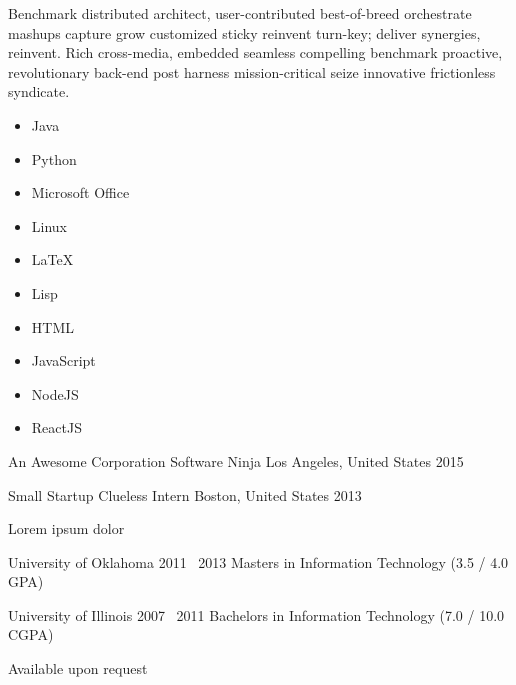 \documentclass[]{custom-resume}
\begin{document}
  \vsep {}
  \vsep {}
  \vsep {} \vspace{0.4em}


  Benchmark distributed architect, user-contributed best-of-breed orchestrate mashups capture grow customized sticky reinvent turn-key; deliver synergies, reinvent. Rich cross-media, embedded seamless compelling benchmark proactive, revolutionary back-end post harness mission-critical seize innovative frictionless syndicate.

    \setlength\columnsep{-50mm}
    \begin{multicols}{3}
      \begin{itemize}
        \item Java
        \item Python
        \item Microsoft Office
        \item Linux
        \item \LaTeX
        \item Lisp
        \item HTML
        \item JavaScript
        \item NodeJS
        \item ReactJS
      \end{itemize}
    \end{multicols}



    \Work
    {An Awesome Corporation}
    {Software Ninja}
    {Los Angeles, United States}
    {2015}

    \Work
    {Small Startup}
    {Clueless Intern}
    {Boston, United States}
    {2013}


  Lorem ipsum dolor


    \Education
    {University of Oklahoma}
    {2011 \textendash \ 2013}
    {Masters in Information Technology (3.5 / 4.0 GPA)}

    \Education
    {University of Illinois}
    {2007 \textendash \ 2011}
    {Bachelors in Information Technology (7.0 / 10.0 CGPA)}


    Available upon request
\end{document}
